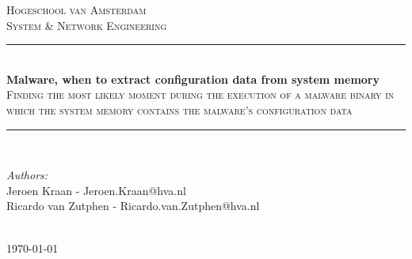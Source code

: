 \documentclass[conference]{IEEEtran}
\begin{document}
\begin{titlepage}

\newcommand{\HRule}{\rule{\linewidth}{0.4mm}} %

\center %
 

\textsc{\LARGE Hogeschool van Amsterdam}\\[1.2cm] 
\textsc{\Large System \& Network Engineering}\\[0.5cm] 



\HRule \\[0.6cm]
{ \huge \bfseries Malware, when to extract configuration data from system memory}\\[0.4cm] %
\textsc{\large Finding the most likely moment during the execution of a malware binary in which the system memory contains the malware's configuration data}\\[0.5cm] %
\HRule \\[4.0cm]
 

\begin{minipage}{1.4\textwidth}
\begin{flushleft} \large
\emph{Authors:}\\
Jeroen Kraan - Jeroen.Kraan@hva.nl\\
Ricardo van Zutphen - Ricardo.van.Zutphen@hva.nl
\end{flushleft}
\end{minipage}

\begin{minipage}{0.4\textwidth}
\end{minipage}\\[4cm]



{\large \today}\\[3cm] %
\vfill %

\end{titlepage}
\onecolumn
\tableofcontents
\end{document}
